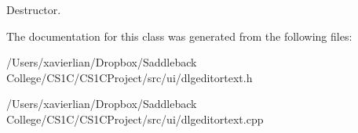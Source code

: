 Destructor. 



The documentation for this class was generated from the following files\+:\begin{DoxyCompactItemize}
\item 
/\+Users/xavierlian/\+Dropbox/\+Saddleback College/\+C\+S1\+C/\+C\+S1\+C\+Project/src/ui/dlgeditortext.\+h\item 
/\+Users/xavierlian/\+Dropbox/\+Saddleback College/\+C\+S1\+C/\+C\+S1\+C\+Project/src/ui/dlgeditortext.\+cpp\end{DoxyCompactItemize}
